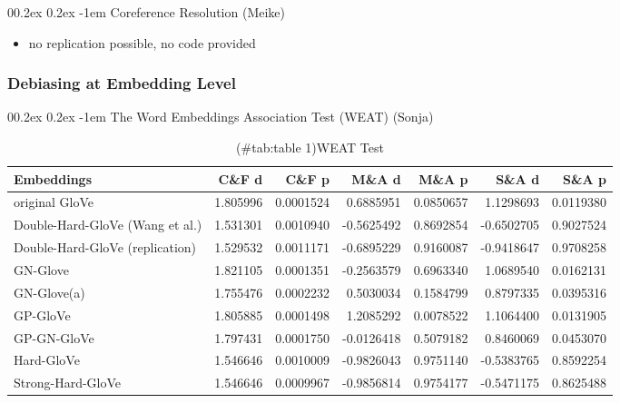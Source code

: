 \documentclass[
  english,
  man,floatsintext]{apa6}
\makeatletter
\providecommand{\tightlist}{%
  \setlength{\itemsep}{0pt}\setlength{\parskip}{0pt}}
\let\oldparagraph\paragraph
\renewcommand{\paragraph}[1]{\oldparagraph{#1}\mbox{}}
\renewcommand{\paragraph}{\@startsection{paragraph}{4}{\parindent}%
  {0\baselineskip \@plus 0.2ex \@minus 0.2ex}%
  {-1em}%
  {\normalfont\normalsize\bfseries\itshape\typesectitle}}
\makeatother
\begin{document}
\hypertarget{coreference-resolution-meike}{%
\paragraph{Coreference Resolution (Meike)}\label{coreference-resolution-meike}}

\begin{itemize}
\tightlist
\item
  no replication possible, no code provided
\end{itemize}

\hypertarget{debiasing-at-embedding-level}{%
\subsubsection{Debiasing at Embedding Level}\label{debiasing-at-embedding-level}}

\hypertarget{the-word-embeddings-association-test-weat-sonja}{%
\paragraph{The Word Embeddings Association Test (WEAT) (Sonja)}\label{the-word-embeddings-association-test-weat-sonja}}

\begin{table}

\caption{(\#tab:table 1)WEAT Test}
\centering
\begin{tabular}[t]{l|r|r|r|r|r|r}
\hline
Embeddings & C\&F d & C\&F p & M\&A d & M\&A p & S\&A d & S\&A p\\
\hline
original GloVe & 1.805996 & 0.0001524 & 0.6885951 & 0.0850657 & 1.1298693 & 0.0119380\\
\hline
Double-Hard-GloVe (Wang et al.) & 1.531301 & 0.0010940 & -0.5625492 & 0.8692854 & -0.6502705 & 0.9027524\\
\hline
Double-Hard-GloVe (replication) & 1.529532 & 0.0011171 & -0.6895229 & 0.9160087 & -0.9418647 & 0.9708258\\
\hline
GN-Glove & 1.821105 & 0.0001351 & -0.2563579 & 0.6963340 & 1.0689540 & 0.0162131\\
\hline
GN-Glove(a) & 1.755476 & 0.0002232 & 0.5030034 & 0.1584799 & 0.8797335 & 0.0395316\\
\hline
GP-GloVe & 1.805885 & 0.0001498 & 1.2085292 & 0.0078522 & 1.1064400 & 0.0131905\\
\hline
GP-GN-GloVe & 1.797431 & 0.0001750 & -0.0126418 & 0.5079182 & 0.8460069 & 0.0453070\\
\hline
Hard-GloVe & 1.546646 & 0.0010009 & -0.9826043 & 0.9751140 & -0.5383765 & 0.8592254\\
\hline
Strong-Hard-GloVe & 1.546646 & 0.0009967 & -0.9856814 & 0.9754177 & -0.5471175 & 0.8625488\\
\hline
\end{tabular}
\end{table}
\end{document}
